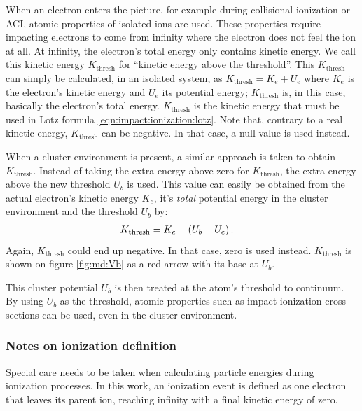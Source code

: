 When an electron enters the picture, for example during collisional ionization
or ACI, atomic properties of isolated ions are used. These properties require
impacting electrons to come from infinity where the electron does not feel the
ion at all. At infinity, the electron's total energy only contains kinetic
energy. We call this kinetic energy $K_{\textrm{thresh}}$ for ``kinetic energy
above the threshold''. This $K_{\textrm{thresh}}$ can simply be calculated, in
an isolated system, as $K_{\textrm{thresh}} = K_e + U_e$ where $K_e$ is the
electron's kinetic energy and $U_e$ its potential energy; $K_{\textrm{thresh}}$
is, in this case, basically the electron's total energy. $K_{\textrm{thresh}}$
is the kinetic energy that must be used in Lotz formula
\eqref{eqn:impact:ionization:lotz}. Note that, contrary to a real kinetic
energy, $K_{\textrm{thresh}}$ can be negative. In that case, a null value is
used instead.

When a cluster environment is present, a similar approach is taken to obtain
$K_{\textrm{thresh}}$. Instead of taking the extra energy above zero for
$K_{\textrm{thresh}}$, the extra energy above the new threshold $U_b$ is used.
This value can easily be obtained from the actual electron's kinetic energy
$K_e$, it's \textit{total} potential energy in the cluster environment and the
threshold $U_b$ by:
\begin{align}
K_{\textrm{thresh}} & = K_e - \left( U_b - U_e \right).
\label{eqn:md:kthresh}
\end{align}
Again, $K_{\textrm{thresh}}$ could end up negative. In that case, zero is used
instead. $K_{\textrm{thresh}}$ is shown on figure \ref{fig:md:Vb} as a red arrow
with its base at $U_b$.

This cluster potential $U_b$ is then treated at the atom's threshold
to continuum. By using $U_b$ as the threshold, atomic properties such as
impact ionization cross-sections can be used, even in the cluster environment.




\subsubsection{Notes on ionization definition}
\label{section:intro:mechanisms:notes}
Special care needs to be taken when calculating particle energies during
ionization processes. In this work, an ionization event is defined as one
electron that leaves its parent ion, reaching infinity with a final kinetic
energy of zero.

